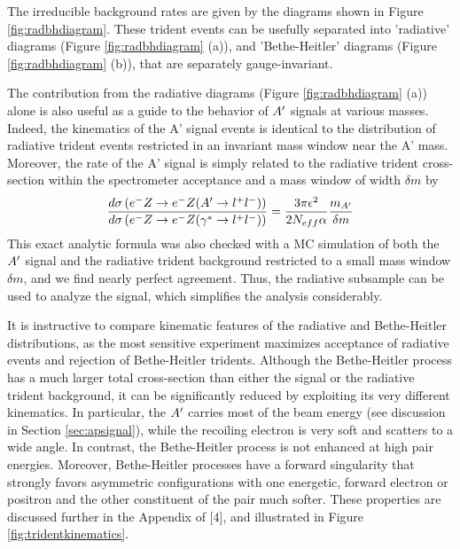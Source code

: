 The irreducible background rates are given by the diagrams shown in Figure \ref{fig:radbhdiagram}. These trident events can be usefully separated into 'radiative' diagrams (Figure \ref{fig:radbhdiagram} (a)), and 'Bethe-Heitler' diagrams (Figure \ref{fig:radbhdiagram} (b)), that are separately gauge-invariant.

The contribution from the radiative diagrams (Figure \ref{fig:radbhdiagram} (a)) alone is also useful as a guide to the behavior of $A^\prime$ signals at various masses. Indeed, the kinematics of the A' signal events is identical to the distribution of radiative trident events restricted in an invariant mass window near the A' mass. Moreover, the rate of the A' signal is simply related to the radiative trident cross-section within the spectrometer acceptance and a mass window of width $\delta m$ by \cite{4}
\begin{equation}
\frac{d\sigma\left(e^- Z \rightarrow e^- Z(A^\prime\rightarrow l^+l^-)\right)}{d\sigma\left(e^- Z \rightarrow e^- Z(\gamma^*\rightarrow l^+l^-)\right)}=\frac{3\pi\epsilon^2}{2 N_{eff}\alpha}\frac{m_{A^\prime}}{\delta m}
\end{equation}
This exact analytic formula was also checked with a MC simulation of both the $A^\prime$ signal and the radiative trident background restricted to a small mass window $\delta m$, and we find nearly perfect agreement. Thus, the radiative subsample can be used to analyze the signal, which simplifies the analysis considerably.

It is instructive to compare kinematic features of the radiative and Bethe-Heitler distributions, as the most sensitive experiment maximizes acceptance of radiative events and rejection of Bethe-Heitler tridents. Although the Bethe-Heitler process has a much larger total cross-section than either the signal or the radiative trident background, it can be significantly reduced by exploiting its very different kinematics. In particular, the $A^\prime$ carries most of the beam energy (see discussion in Section \ref{sec:apsignal}), while the recoiling electron is very soft and scatters to a wide angle. In contrast, the Bethe-Heitler process is not enhanced at high pair energies. Moreover, Bethe-Heitler processes have a forward singularity that strongly favors asymmetric configurations with one energetic, forward electron or positron and the other constituent of the pair much softer.
These properties are discussed further in the Appendix of [4], and illustrated in Figure \ref{fig:tridentkinematics}.


